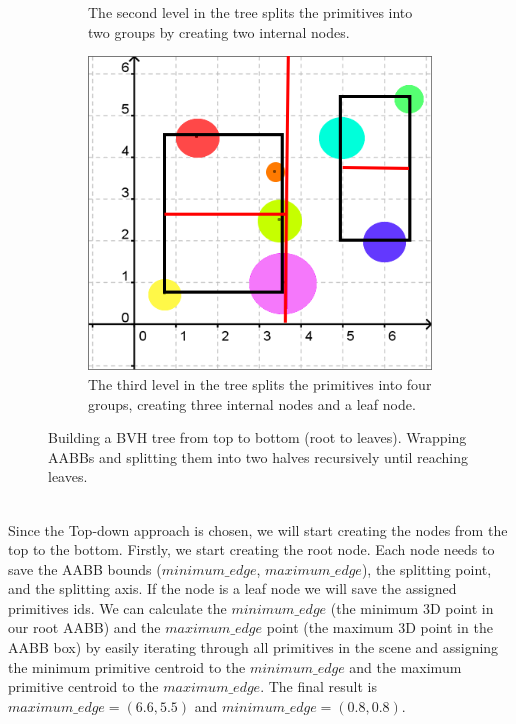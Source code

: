 \documentclass[11pt,a4paper]{article}
\begin{document}
\begin{figure}[h]
\begin{subfigure}[t]{0.3\textwidth}
         \captionsetup{justification=centering,margin=0.1cm}
         \caption{The second level in the tree splits the primitives into two groups by creating two internal nodes.}
         \label{fig:pi_5000}
     \end{subfigure}
     \hfill
     \begin{subfigure}[t]{0.3\textwidth}
         \centering
         \includegraphics[width=\textwidth]{images/example_bvh/4.png}
         \captionsetup{justification=centering,margin=0.1cm}
         \caption{The third level in the tree splits the primitives into four groups, creating three internal nodes and a leaf node.}
         \label{fig:pi_18000}
     \end{subfigure}
        \captionsetup{justification=centering,margin=2cm}
        \caption{Building a BVH tree from top to bottom (root to leaves). Wrapping AABBs and splitting them into two halves recursively until reaching leaves.}
        \label{fig:three graphs}
\end{figure}

\noindent
\\
Since the Top-down approach is chosen, we will start creating the nodes from the top to the bottom. Firstly, we start creating the root node. Each node needs to save the AABB bounds ($minimum\_edge$, $maximum\_edge$), the splitting point, and the splitting axis. If the node is a leaf node we will save the assigned primitives ids.  We can calculate the $minimum\_edge$ (the minimum 3D point in our root AABB) and the $maximum\_edge$ point (the maximum 3D point in the AABB box) by easily iterating through all primitives in the scene and assigning the minimum primitive centroid to the  $minimum\_edge$ and the maximum primitive centroid to the $maximum\_edge$. The final result is $maximum\_edge = (6.6, 5.5)$ and  $minimum\_edge = (0.8,0.8)$.
\end{document}
